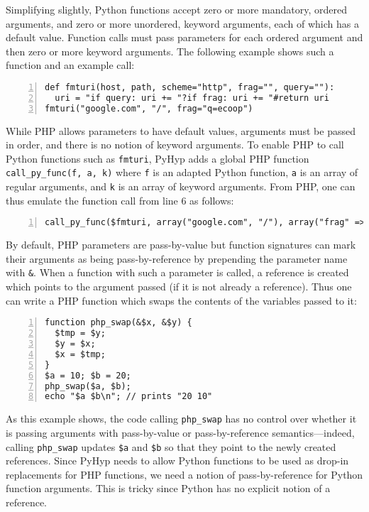 \documentclass[a4paper,UKenglish]{lipics-v2016}
\newcommand{\ourvm}{PyHyp\xspace}
\begin{document}
Simplifying slightly, Python functions accept zero or more mandatory,
ordered arguments, and zero or more unordered,
keyword arguments, each of which has a default value. Function
calls must pass parameters for each ordered argument and then
zero or more keyword arguments. The following example shows such a
function and an example call:
\begin{lstlisting}[numbers=left]
def fmturi(host, path, scheme="http", frag="", query=""):
  uri = "if query: uri += "?if frag: uri += "#return uri
fmturi("google.com", "/", frag="q=ecoop")
\end{lstlisting}
While PHP allows parameters to have default values, arguments
must be passed in order, and there is no notion of keyword arguments. To
enable PHP to call Python functions such as \texttt{fmturi},
\ourvm adds a global PHP function \texttt{call\_py\_func(f, a,
k)} where \texttt{f} is an adapted Python function, \texttt{a} is an array of regular arguments, and \texttt{k} is an
array of keyword arguments. From PHP, one can thus emulate the
function call from line 6 as follows:
\begin{lstlisting}[numbers=left]
call_py_func($fmturi, array("google.com", "/"), array("frag" => "q=ecoop")).
\end{lstlisting}
By default, PHP parameters are pass-by-value but function signatures can mark their
arguments as being pass-by-reference by prepending the parameter name with
\texttt{\&}. When a function with such a parameter is called, a reference
is created which points to the argument passed (if it is not already
a reference). Thus one can write a PHP function which swaps the
contents of the variables passed to it:\label{php swap}

\begin{lstlisting}[numbers=left]
function php_swap(&$x, &$y) {
  $tmp = $y;
  $y = $x;
  $x = $tmp;
}
$a = 10; $b = 20;
php_swap($a, $b);
echo "$a $b\n"; // prints "20 10"
\end{lstlisting}

\noindent As this example shows, the code calling \texttt{php\_swap}
has no control over whether it is passing arguments with pass-by-value or
pass-by-reference semantics---indeed, calling \texttt{php\_swap} updates
\texttt{\$a} and \texttt{\$b} so that they point to
the newly created references. Since \ourvm needs
to allow Python functions to be used as drop-in replacements for PHP functions, we need
a notion of pass-by-reference for Python function
arguments. This is tricky since Python has no explicit notion of a reference.
\end{document}
